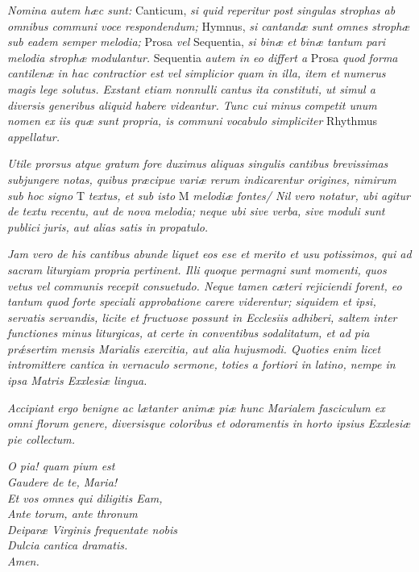 {\it Nomina autem hæc sunt: }{\sc Canticum,} {\it si quid reperitur post singulas strophas ab omnibus communi voce respondendum;} {\sc Hymnus,} {\it si cantandæ sunt omnes strophæ sub eadem semper melodia;} {\sc Prosa} {\it vel} {\sc Sequentia,} {\it si binæ et binæ tantum pari melodia strophæ modulantur.} Sequentia {\it autem in eo differt a} Prosa {\it quod forma cantilenæ in hac contractior est vel simplicior quam in illa, item et numerus magis lege solutus. Exstant etiam nonnulli cantus ita constituti, ut simul a diversis generibus aliquid habere videantur. Tunc cui minus competit unum nomen ex iis quæ sunt propria, is communi vocabulo simpliciter} {\sc Rhythmus} {\it appellatur.}

{\it Utile prorsus atque gratum fore duximus aliquas singulis cantibus brevissimas subjungere notas, quibus præcipue variæ rerum indicarentur origines, nimirum sub hoc signo} T {\it textus, et sub isto} M {\it melodiæ fontes/ Nil vero notatur, ubi agitur de textu recentu, aut de nova melodia; neque ubi sive verba, sive moduli sunt publici juris, aut alias satis in propatulo.}

{\it Jam vero de his cantibus abunde liquet eos ese et merito et usu potissimos, qui ad sacram liturgiam propria pertinent. Illi quoque permagni sunt momenti, quos vetus vel communis recepit consuetudo. Neque tamen cæteri rejiciendi forent, eo tantum quod forte speciali approbatione carere viderentur; siquidem et ipsi, servatis servandis, licite et fructuose possunt in Ecclesiis adhiberi, saltem inter functiones minus liturgicas, at certe in conventibus sodalitatum, et ad pia prǽsertim mensis Marialis exercitia, aut alia hujusmodi. Quoties enim licet intromittere cantica in vernaculo sermone, toties a fortiori in latino, nempe in ipsa Matris Exxlesiæ lingua.}

{\it Accipiant ergo benigne ac lætanter animæ piæ hunc Marialem fasciculum ex omni florum genere, diversisque coloribus et odoramentis in horto ipsius Exxlesiæ pie collectum.}

\begin{center}
{\it O pia! quam pium est\\
Gaudere de te, Maria!\\
Et vos omnes qui diligitis Eam,\\
Ante torum, ante thronum\\
Deiparæ Virginis frequentate nobis\\
Dulcia cantica dramatis.\\
Amen.}
\end{center}
